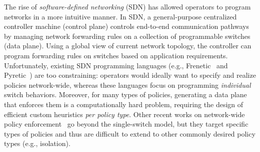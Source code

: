 

The rise of \emph{software-defined networking} (SDN) has allowed
operators to program networks in a more intuitive manner. In SDN, a
general-purpose centralized controller machine (control plane)
controls end-to-end communication pathways by managing network
forwarding rules on a collection of programmable switches (data
plane). Using a global view of current network topology, the
controller can program forwarding rules on switches based on
application requirements.
Unfortunately, existing SDN programming languages (e.g.,
Frenetic~\cite{frenetic} and Pyretic~\cite{pyretic}) are too
constraining: operators would ideally want to specify and realize
policies network-wide, whereas these languages focus on programming
{\em individual} switch behaviors.  Moreover, for many types of
policies, generating a data plane that enforces them is a
computationally hard problem, requiring the design of efficient custom
heuristics {\em per policy type}. Other recent works on network-wide
policy enforcement~\cite{merlin,simple} go beyond the single-switch
model, but they target specific types of policies and thus are
difficult to extend to other commonly desired policy types (e.g.,
isolation).







